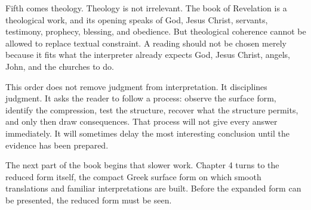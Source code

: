 Fifth comes theology. Theology is not irrelevant. The book of Revelation is a theological work, and its opening speaks of God, Jesus Christ, servants, testimony, prophecy, blessing, and obedience. But theological coherence cannot be allowed to replace textual constraint. A reading should not be chosen merely because it fits what the interpreter already expects God, Jesus Christ, angels, John, and the churches to do.

This order does not remove judgment from interpretation. It disciplines judgment. It asks the reader to follow a process: observe the surface form, identify the compression, test the structure, recover what the structure permits, and only then draw consequences. That process will not give every answer immediately. It will sometimes delay the most interesting conclusion until the evidence has been prepared.

The next part of the book begins that slower work. Chapter 4 turns to the reduced form itself, the compact Greek surface form on which smooth translations and familiar interpretations are built. Before the expanded form can be presented, the reduced form must be seen.
